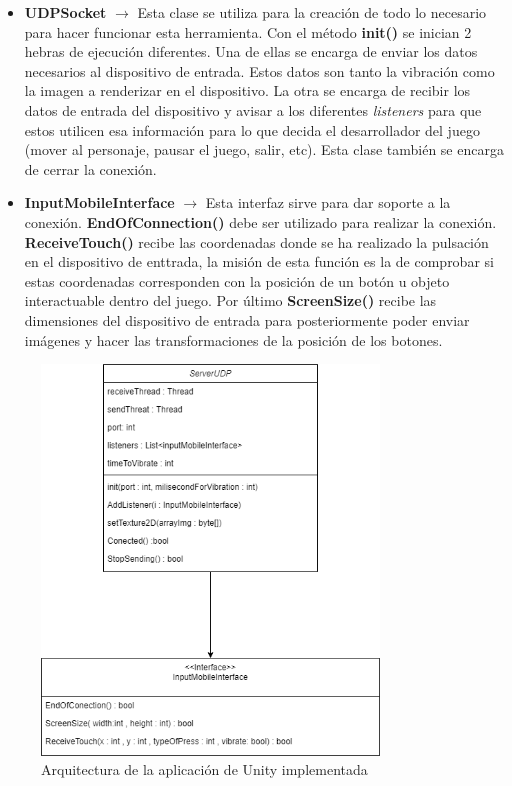 \begin {itemize}
\item \textbf{UDPSocket} $\rightarrow$ Esta clase se utiliza para la creaci\'on de todo lo necesario para hacer funcionar esta herramienta. Con el m\'etodo \textbf{init()} se inician 2 hebras de ejecuci\'on diferentes. Una de ellas se encarga de enviar los datos necesarios al dispositivo de entrada. Estos datos son tanto la vibraci\'on como la imagen a renderizar en el dispositivo. La otra se encarga de recibir los datos de entrada del dispositivo y avisar a los diferentes \textit{listeners} para que estos utilicen esa informaci\'on para lo que decida el desarrollador del juego (mover al personaje, pausar el juego, salir, etc). Esta clase tambi\'en se encarga de cerrar la conexi\'on.
\item \textbf{InputMobileInterface} $\rightarrow$ Esta interfaz sirve para dar soporte a la conexi\'on.\textbf{ EndOfConnection()} debe ser utilizado para realizar la conexi\'on. \textbf{ReceiveTouch()} recibe las coordenadas donde se ha realizado la pulsaci\'on en el dispositivo de enttrada, la misi\'on de esta funci\'on es la de comprobar si estas coordenadas corresponden con la posici\'on de un bot\'on u objeto interactuable dentro del juego. Por \'ultimo \textbf{ScreenSize()} recibe las dimensiones del dispositivo de entrada para posteriormente poder enviar im\'agenes y hacer las transformaciones de la posici\'on de los botones.
\end {itemize}

\begin{figure}[h]

\centering
\includegraphics[width=0.8\textwidth]{./Imagenes/Bitmap/Arquitectura Unity}
\caption{Arquitectura de la aplicaci\'on de Unity implementada}
\end{figure}

